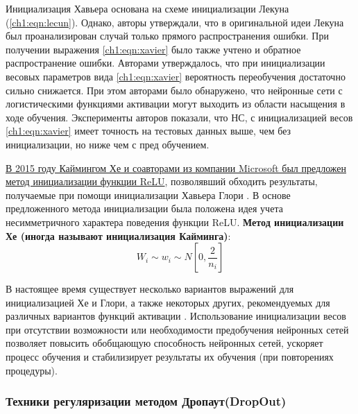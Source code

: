 \documentclass[12pt]{article}
\begin{document}
\begin{sloppypar}
Инициализация Хавьера основана на схеме инициализации Лекуна (\ref{ch1:eqn:lecun}). Однако, авторы \cite{glorot2010understanding} утверждали, что в оригинальной идеи Лекуна был проанализирован случай только прямого распространения ошибки. При получении выражения  \ref{ch1:eqn:xavier} было также учтено и обратное распространение ошибки. Авторами \cite{glorot2010understanding} утверждалось, что при инициализации весовых параметров вида \ref{ch1:eqn:xavier} вероятность переобучения достаточно сильно снижается. При этом авторами было обнаружено, что нейронные сети с логистическими функциями активации могут выходить из области насыщения в ходе обучения. Эксперименты авторов показали, что НС, с инициализацией весов \ref{ch1:eqn:xavier} имеет точность на тестовых данных выше, чем без инициализации, но ниже чем с пред обучением.

\uline{В 2015 году Каймингом Хе и соавторами из компании Microsoft был предложен метод инициализации функции ReLU}, позволявший обходить результаты, получаемые при помощи инициализации Хавьера Глори \cite{he2015delving}. В основе предложенного метода инициализации была положена идея учета несимметричного характера поведения функции  ReLU.  \textbf{Метод инициализации Хе (иногда называют инициализация Кайминга)}:
\begin{equation}
    \label{ch1:eqn:he}
    W_i\sim w_i\sim N\left[0 ,\frac{2}{n_i} \right]
\end{equation}

В настоящее время существует несколько вариантов выражений для инициализацией Хе и Глори, а также некоторых других, рекомендуемых для различных вариантов функций активации \cite{narkhede2021review}. Использование инициализации весов при отсутствии возможности или необходимости предобучения  нейронных сетей позволяет повысить обобщающую способность нейронных сетей, ускоряет процесс обучения и стабилизирует результаты их обучения (при повторениях процедуры).

\subsubsection{Техники регуляризации методом Дропаут(DropOut)}


\end{sloppypar}
\end{document}
